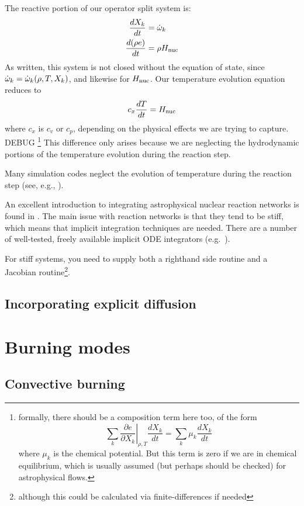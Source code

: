 The reactive portion of our operator split system is:
\begin{align}
\frac{dX_k}{dt} &= {\dot{\omega}}_k \\
\frac{d(\rho e)}{dt} &= \rho {H_\mathrm{nuc}}
\end{align}
As written, this system is not closed without the equation of state,
since ${\dot{\omega}}_k = {\dot{\omega}}_k(\rho, T, X_k)$, and likewise for
${H_\mathrm{nuc}}$.  Our temperature evolution equation reduces to
\begin{equation}
c_x \frac{dT}{dt} = {H_\mathrm{nuc}}
\end{equation}
where $c_x$ is $c_v$ or $c_p$, depending on the physical effects we are
trying to capture.
\if DEBUG
\footnote{formally, there should be a composition term here too, of the
form
\[
\sum_k \left . \frac{\partial e}{\partial X_k} \right |_{\rho,T} \frac{dX_k}{dt}  =
      \sum_k \mu_k \frac{dX_k}{dt} 
\]
where $\mu_k$ is the chemical potential.  But this term is zero if we
are in chemical equilibrium, which is usually assumed (but perhaps
should be checked) for astrophysical flows.  }
\fi
This difference only arises because we are neglecting the hydrodynamic
portions of the temperature evolution during the reaction step.

Many simulation codes neglect the evolution of temperature during the
reaction step (see, e.g., \cite{flash}).

An excellent introduction to integrating astrophysical nuclear
reaction networks is found in \cite{timmes_nets}.  The main issue with
reaction networks is that they tend to be stiff, which means that
implicit integration techniques are needed.  There are a number of
well-tested, freely available implicit ODE integrators
(e.g.~\cite{vode}).

For stiff systems, you need to supply both a righthand side routine
and a Jacobian routine\footnote{although this could be calculated via
  finite-differences if needed}.


\subsection{Incorporating explicit diffusion}



\section{Burning modes}


\subsection{Convective burning}



